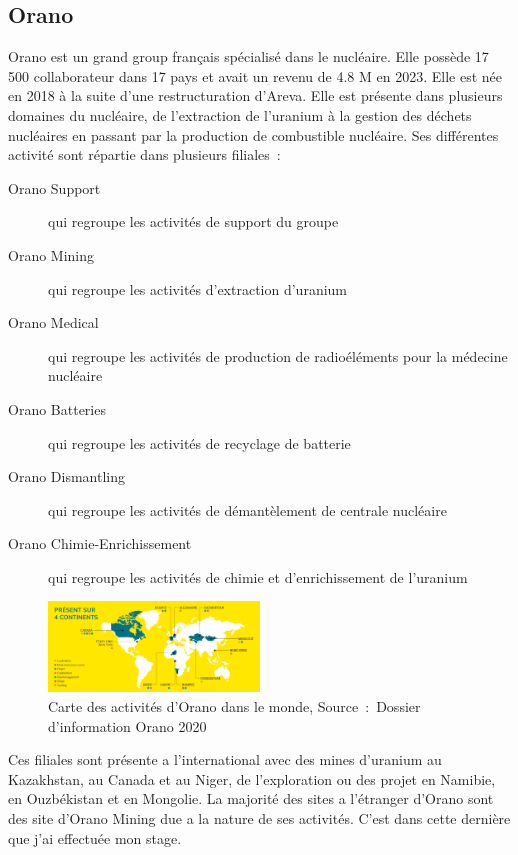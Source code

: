 \subsection{Orano}
Orano est un grand group français spécialisé dans le nucléaire. Elle possède 17 500 collaborateur dans 17 pays et avait un revenu de 4.8 M en 2023\cite{report:rapport_activiter}. Elle est née en 2018 à la suite d'une restructuration d'Areva. Elle est présente dans plusieurs domaines du nucléaire, de l'extraction de l'uranium à la gestion des déchets nucléaires en passant par la production de combustible nucléaire. Ses différentes activité sont répartie dans plusieurs filiales~:
\begin{description}
\item [Orano Support] qui regroupe les activités de support du groupe
\item [Orano Mining] qui regroupe les activités d'extraction d'uranium
\item [Orano Medical] qui regroupe les activités de production de radioéléments pour la médecine nucléaire
\item [Orano Batteries] qui regroupe les activités de recyclage de batterie
\item [Orano Dismantling] qui regroupe les activités de démantèlement de centrale nucléaire
\item [Orano Chimie-Enrichissement] qui regroupe les activités de chimie et d'enrichissement de l'uranium
\end{description}
\begin{figure}
    \centering
    \includegraphics[width=0.5\textwidth]{img/Carte-ornao-international.png}
    \caption[Carte des activités d’Orano dans le monde]{Carte des activités d’Orano dans le monde, Source~:~Dossier d’information Orano 2020}
    \label{fig_carte_orano}
\end{figure}









Ces filiales sont présente a l'international avec des mines d'uranium au Kazakhstan, au Canada et au Niger, de l'exploration ou des projet en Namibie, en Ouzbékistan et en Mongolie. La majorité des sites a l'étranger d'Orano sont des site d'Orano Mining due a la nature de ses activités. C'est dans cette dernière que j'ai effectuée mon stage.
